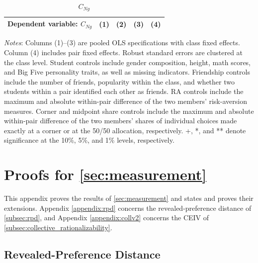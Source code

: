 \documentclass[11 pt]{article}
\begin{document}
\begin{table}[H]
\centering
\caption{$C_{Ng}$}
\label{tab:collective_cng}
\begin{tabular}{lcccc}
\toprule \hline
Dependent variable: $C_{Ng}$ & (1) & (2) & (3) & (4) \\ \midrule

\end{tabular}

\begin{minipage}{\textwidth}
{\footnotesize \emph{Notes}: Columns (1)--(3) are pooled OLS specifications with class fixed effects.
Column (4) includes pair fixed effects.
Robust standard errors are clustered at the class level.
Student controls include gender composition, height, math scores, and Big Five
personality traits, as well as missing indicators.
Friendship controls include the number of friends, popularity within the class,
and whether two students within a pair identified each other as friends.
RA controls include the maximum and absolute within-pair difference of the two
members' risk-aversion measures.
Corner and midpoint share controls include the maximum and absolute within-pair
difference of the two members' shares of individual choices made exactly at a
corner or at the 50/50 allocation, respectively.
+, *, and ** denote significance at the 10\%, 5\%, and 1\% levels, respectively.}
\end{minipage}
\end{table}


\newpage


\section{Proofs for \autoref{sec:measurement}}\label{appendix:measurement}

This appendix proves the results of \autoref{sec:measurement} and states and proves their extensions. Appendix \autoref{appendix:rpd} concerns the revealed-preference distance of \autoref{subsec:rpd}, and Appendix \autoref{appendix:collv2} concerns the CEIV of \autoref{subsec:collective_rationalizability}.

\subsection{Revealed-Preference Distance}\label{appendix:rpd}
\end{document}
